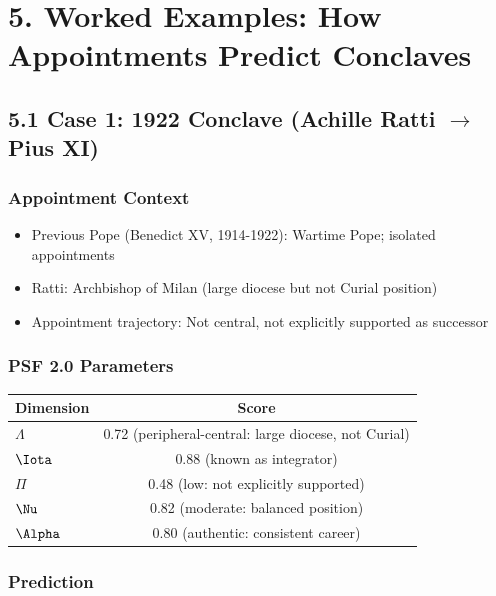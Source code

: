 \documentclass[11pt]{article}
\begin{document}
\section{5. Worked Examples: How Appointments Predict Conclaves}

\subsection{5.1 Case 1: 1922 Conclave (Achille Ratti $\to$ Pius XI)}

\subsubsection{Appointment Context}

\begin{itemize}
\item Previous Pope (Benedict XV, 1914-1922): Wartime Pope; isolated appointments
\item Ratti: Archbishop of Milan (large diocese but not Curial position)
\item Appointment trajectory: Not central, not explicitly supported as successor
\end{itemize}

\subsubsection{PSF 2.0 Parameters}

\begin{table}[h]
\centering
\begin{tabular}{|l|c|}
\hline
Dimension & Score \\
\hline
$\Lambda$ & 0.72 (peripheral-central: large diocese, not Curial) \\
$\Iota$ & 0.88 (known as integrator) \\
$\Pi$ & 0.48 (low: not explicitly supported) \\
$\Nu$ & 0.82 (moderate: balanced position) \\
$\Alpha$ & 0.80 (authentic: consistent career) \\
\hline
\end{tabular}
\end{table}

\subsubsection{Prediction}
\end{document}

